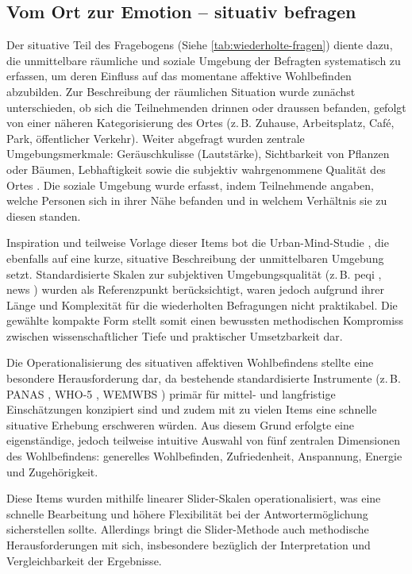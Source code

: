\subsection{Vom Ort zur Emotion -- situativ befragen}

Der situative Teil des Fragebogens (Siehe \cref{tab:wiederholte-fragen}) diente dazu, die unmittelbare räumliche und soziale Umgebung der Befragten systematisch zu erfassen, um deren Einfluss auf das momentane affektive Wohlbefinden abzubilden. Zur Beschreibung der räumlichen Situation wurde zunächst unterschieden, ob sich die Teilnehmenden drinnen oder draussen befanden, gefolgt von einer näheren Kategorisierung des Ortes (z.\,B. Zuhause, Arbeitsplatz, Café, Park, öffentlicher Verkehr). Weiter abgefragt wurden zentrale Umgebungsmerkmale: Geräuschkulisse (Lautstärke), Sichtbarkeit von Pflanzen oder Bäumen, Lebhaftigkeit sowie die subjektiv wahrgenommene Qualität des Ortes . Die soziale Umgebung wurde erfasst, indem Teilnehmende angaben, welche Personen sich in ihrer Nähe befanden und in welchem Verhältnis sie zu diesen standen.

Inspiration und teilweise Vorlage dieser Items bot die Urban-Mind-Studie \parencite{bakolisUrbanMindUsing2018}, die ebenfalls auf eine kurze, situative Beschreibung der unmittelbaren Umgebung setzt. Standardisierte Skalen zur subjektiven Umgebungsqualität (z.\,B. \acrfull{peqi} \parencite{bonaiutoPerceivedResidentialEnvironment2015}, \acrfull{news} \parencite{saelensNeighborhoodEnvironmentWalkability2018}) wurden als Referenzpunkt berücksichtigt, waren jedoch aufgrund ihrer Länge und Komplexität für die wiederholten Befragungen nicht praktikabel. Die gewählte kompakte Form stellt somit einen bewussten methodischen Kompromiss zwischen wissenschaftlicher Tiefe und praktischer Umsetzbarkeit dar.

Die Operationalisierung des situativen affektiven Wohlbefindens stellte eine besondere Herausforderung dar, da bestehende standardisierte Instrumente (z.\,B. PANAS \parencite{yountMeasuringMoodComparison2023}, WHO-5 \parencite{toppWHO5WellBeingIndex2015}, WEMWBS \parencite{tennantWarwickEdinburghMentalWellbeing2007}) primär für mittel- und langfristige Einschätzungen konzipiert sind und zudem mit zu vielen Items eine schnelle situative Erhebung erschweren würden. Aus diesem Grund erfolgte eine eigenständige, jedoch teilweise intuitive Auswahl von fünf zentralen Dimensionen des Wohlbefindens: generelles Wohlbefinden, Zufriedenheit, Anspannung, Energie und Zugehörigkeit.

Diese Items wurden mithilfe linearer Slider-Skalen operationalisiert, was eine schnelle Bearbeitung und höhere Flexibilität bei der Antwortermöglichung sicherstellen sollte. Allerdings bringt die Slider-Methode auch methodische Herausforderungen mit sich, insbesondere bezüglich der Interpretation und Vergleichbarkeit der Ergebnisse.

